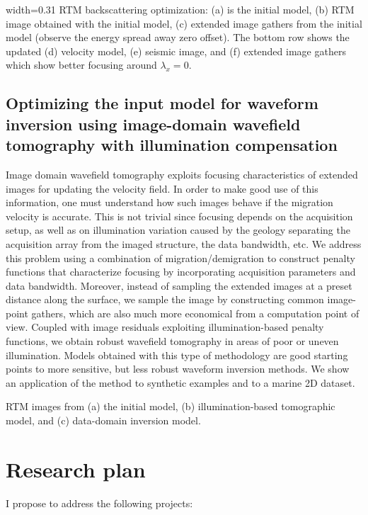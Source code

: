 {width=0.31\textwidth}%
{RTM backscattering optimization: (a) is the initial model, (b) RTM image obtained with the initial model,
(c) extended image gathers from the initial model (observe the energy spread away zero offset). 
The bottom row shows the updated (d) velocity model, (e) seismic image, and (f) extended image gathers 
which show better focusing around $\lambda_x=0$.}



\subsection{Optimizing the input model for waveform inversion using image-domain
 wavefield tomography with illumination compensation \citep{pantin2015optimizing}}

Image domain wavefield tomography exploits focusing characteristics of extended images 
for updating the velocity field. In order to make good use of this information, one must 
understand how such images behave if the migration velocity is accurate. This is not trivial 
since focusing depends on the acquisition setup, as well as on illumination variation caused by 
the geology separating the acquisition array from the imaged structure, the data bandwidth, etc. We 
address this problem using a combination of migration/demigration to construct penalty functions that
 characterize focusing by incorporating acquisition parameters and data bandwidth. Moreover, instead of
 sampling the extended images at a preset distance along the surface, we sample the image by constructing 
common image-point gathers, which are also much more economical from a computation point of view. Coupled
 with image residuals exploiting illumination-based penalty functions, we obtain robust wavefield 
tomography in areas of poor or uneven illumination. Models obtained with this type of methodology 
are good starting points to more sensitive, but less robust waveform inversion methods. We show
an application of the method to synthetic examples and  to a marine 2D dataset.



%
{RTM images from (a) the initial model, (b) illumination-based tomographic model, and (c) data-domain inversion model.}


\section{Research plan}
I propose to address the following projects:


